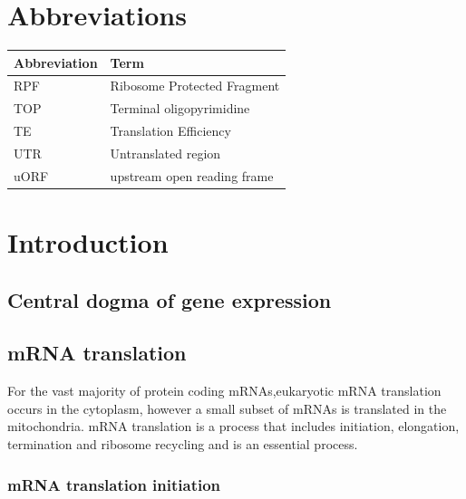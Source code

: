\documentclass[12pt,openany]{book}
\author{}
\date{\vspace{-2.5em}}
\begin{document}
{
\setcounter{tocdepth}{3}
\tableofcontents
}
\cleardoublepage
\pagestyle{fancy} \fancyhf{} \renewcommand{\headrulewidth}{0pt}
\fancyfoot[LE,RO]{\thepage} \renewcommand{\floatpagefraction}{.9}
\setcounter{page}{9}

\chapter*{Abbreviations}\label{abbreviations}

\begin{tabular}{ll}
\toprule
Abbreviation & Term\\
\midrule
RPF & Ribosome Protected Fragment\\
TOP & Terminal oligopyrimidine\\
TE & Translation Efficiency\\
UTR & Untranslated region\\
uORF & upstream open reading frame\\
\bottomrule
\end{tabular}

\chapter{Introduction}

\section{Central dogma of gene expression}

\section{mRNA translation}

For the vast majority of protein coding mRNAs,eukaryotic mRNA
translation occurs in the cytoplasm, however a small subset of mRNAs is
translated in the mitochondria. mRNA translation is a process that
includes initiation, elongation, termination and ribosome recycling and
is an essential process.

\subsection{mRNA translation initiation}
\end{document}
